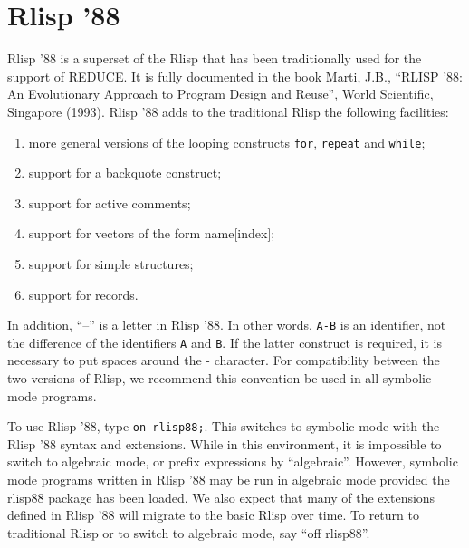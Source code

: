 \section{Rlisp '88}

Rlisp '88 is a superset of the Rlisp that has been traditionally used for
the support of REDUCE.  It is fully documented in the book
Marti, J.B., ``{RLISP} '88:  An Evolutionary Approach to Program Design
and Reuse'', World Scientific, Singapore (1993).
Rlisp '88 adds to the traditional Rlisp the following facilities:
\begin{enumerate}
\item more general versions of the looping constructs {\tt for},
{\tt repeat} and {\tt while};

\item support for a backquote construct;

\item support for active comments;

\item support for vectors of the form name[index];

\item support for simple structures;

\item support for records.
\end{enumerate}

In addition, ``--'' is a letter in Rlisp '88.  In other words, {\tt A-B} is an
identifier, not the difference of the identifiers {\tt A} and {\tt B}.  If
the latter construct is required, it is necessary to put spaces around the
- character.  For compatibility between the two versions of Rlisp, we
recommend this convention be used in all symbolic mode programs.

\hypertarget{switch:RLISP88}{}
To use Rlisp '88, type {\tt on rlisp88;}.  This switches to
symbolic mode with the Rlisp '88 syntax and extensions.  While in this
environment, it is impossible to switch to algebraic mode, or prefix
expressions by ``algebraic''.  However, symbolic mode programs written in
Rlisp '88 may be run in algebraic mode provided the rlisp88 package has been
loaded.  We also expect that many of the extensions defined in Rlisp '88
will migrate to the basic Rlisp over time.  To return to traditional Rlisp
or to switch to algebraic mode, say ``off rlisp88''.

